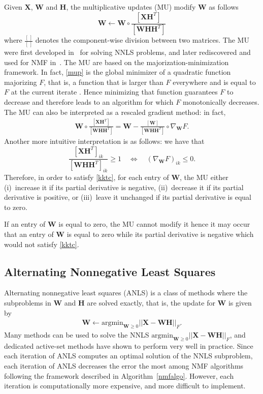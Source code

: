 \documentclass[11pt]{article}
\begin{document}
Given $\mathbf{X}$, $\mathbf{W}$ and $\mathbf{H}$, the multiplicative updates (MU) modify $\mathbf{W}$ as follows 
\begin{equation} \tag{MU} 
\label{mup}
\mathbf{W} \leftarrow \mathbf{W} \circ \frac{\left[\mathbf{XH}^T\right]}{\left[\mathbf{WHH}^T\right]}
\end{equation}
where $\frac{[\,]}{[\,]}$ denotes the component-wise division between two matrices. The MU were first developed in~\cite{DM86} for solving NNLS problems, and later rediscovered and used for NMF in~\cite{94}. 
The MU are based on the majorization-minimization framework. In fact, \eqref{mup} is the global minimizer of a quadratic function majorizing $F$, that is, a function that is larger than $F$ everywhere and is equal to $F$ at the current iterate \cite{DM86} \cite{94}. Hence minimizing that function guarantees $F$ to decrease and therefore leads to an algorithm for which $F$ monotonically decreases. 
The MU can also be interpreted as a rescaled gradient method: in fact, 
\begin{eqnarray} \label{mugrad}
\mathbf{W} \circ \frac{\left[\mathbf{XH}^T\right]}{\left[\mathbf{WHH}^T\right]} = \mathbf{W} -  \frac{\left[\mathbf{W}\right]}{\left[\mathbf{WHH}^T\right]} \circ  \nabla_{\mathbf{W}} F . 
\end{eqnarray}
Another more intuitive interpretation is as follows: we have that 
$$\frac{\left[\mathbf{XH}^T\right]_{ik}}{\left[\mathbf{WHH}^T\right]_{ik}} \geq 1 \quad \iff \quad \left(\nabla_{\mathbf{W}} F\right)_{ik} \leq 0.$$
Therefore, in order to satisfy \eqref{kktc}, for each entry of $\mathbf{W}$, the MU either 
(i)~increase it if its partial derivative is negative,   
(ii)~decrease it if its partial derivative is positive,  or 
(iii)~leave it unchanged if its partial derivative is equal to zero. 

If an entry of $\mathbf{W}$ is equal to zero, the MU cannot modify it hence it may occur that an entry of $\mathbf{W}$ is equal to zero while its partial derivative is negative which would not satisfy \eqref{kktc}.  

\subsection{Alternating Nonnegative Least Squares} \label{anls}

Alternating nonnegative least squares (ANLS) is a class of methods where the subproblems in $\mathbf{W}$ and $\mathbf{H}$ are solved exactly, that is, the update for $\mathbf{W}$ is given by  
\begin{eqnarray*}
\mathbf{W}  \leftarrow  \textrm{argmin}_{\mathbf{W} \geq 0} ||\mathbf{X-WH}||_F .  
\end{eqnarray*} 
Many methods can be used to solve the NNLS $\textrm{argmin}_{\mathbf{W} \geq 0} ||\mathbf{X-WH}||_F$, and dedicated active-set methods have shown to perform very well in practice. Since each iteration of ANLS computes an optimal solution of the NNLS subproblem, each iteration of ANLS decreases the error the most among NMF algorithms following the framework described in Algorithm~\ref{nmfalgo}. However, each iteration is computationally more expensive, and more difficult to implement. 
\end{document}
